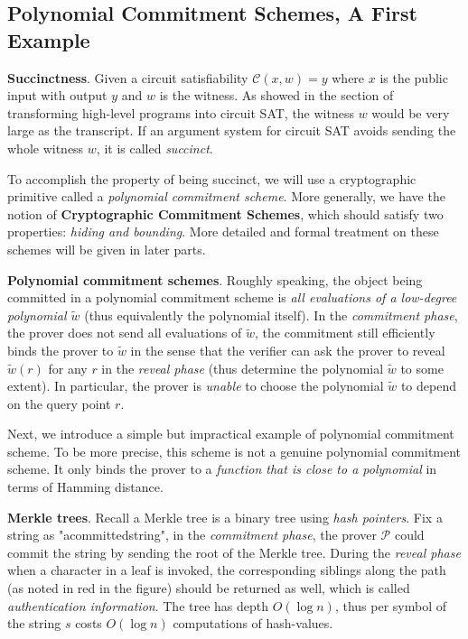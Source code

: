 \documentclass{article}
\begin{document}
\subsection{Polynomial Commitment Schemes, A First Example}

\textbf{Succinctness}. Given a circuit satisfiability $\mathcal{C}(x, w) = y$ where $x$ is the public input with output $y$ and $w$ is the witness. As showed in the section of transforming high-level programs into circuit SAT, the witness $w$ would be very large as the transcript. If an argument system for circuit SAT avoids sending the whole witness $w$, it is called \textit{succinct}. 

To accomplish the property of being succinct, we will use a cryptographic primitive called a \textit{polynomial commitment scheme}. More generally, we have the notion of \textbf{Cryptographic Commitment Schemes}, which should satisfy two properties: \textit{hiding and bounding}. More detailed and formal treatment on these schemes will be given in later parts. 

\textbf{Polynomial commitment schemes}. Roughly speaking, the object being committed in a polynomial commitment scheme is \textit{all evaluations of a low-degree polynomial $\widetilde{w}$} (thus equivalently the polynomial itself). In the \textit{commitment phase}, the prover does not send all evaluations of $\widetilde{w}$, the commitment still efficiently binds the prover to $\widetilde{w}$ in the sense that the verifier can ask the prover to reveal $\widetilde{w}(r)$ for any $r$ in the \textit{reveal phase} (thus determine the polynomial $\widetilde{w}$ to some extent). In particular, the prover is \textit{unable} to choose the polynomial $\widetilde{w}$ to depend on the query point $r$. 

Next, we introduce a simple but impractical example of polynomial commitment scheme. To be more precise, this scheme is not a genuine polynomial commitment scheme. It only binds the prover to a \textit{function that is close to a polynomial} in terms of Hamming distance. 

\textbf{Merkle trees}. Recall a Merkle tree is a binary tree using \textit{hash pointers}. Fix a string as "acommittedstring", in the \textit{commitment phase}, the prover $\mathcal{P}$ could commit the string by sending the root of the Merkle tree. During the \textit{reveal phase} when a character in a leaf is invoked, the corresponding siblings along the path (as noted in red in the figure) should be returned as well, which is called \textit{authentication information}. The tree has depth $O(\log n)$, thus per symbol of the string $s$ costs $O(\log n)$ computations of hash-values.
\end{document}
